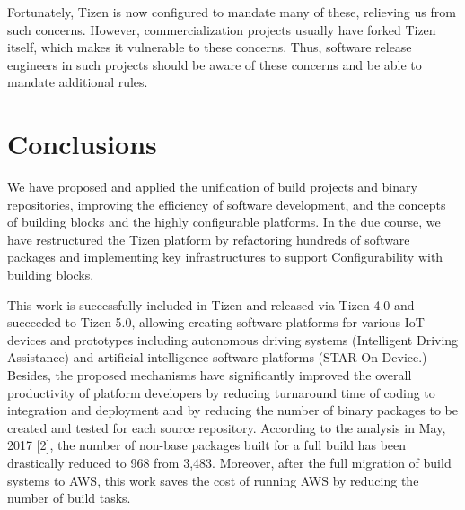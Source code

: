 Fortunately, Tizen is now configured to mandate many of these, relieving us from such concerns. However, commercialization projects usually have forked Tizen itself, which makes it vulnerable to these concerns. Thus, software release engineers in such projects should be aware of these concerns and be able to mandate additional rules.


\section{Conclusions}

We have proposed and applied the unification of build projects and binary repositories, improving the efficiency of software development, and the concepts of building blocks and the highly configurable platforms. In the due course, we have restructured the Tizen platform by refactoring hundreds of software packages and implementing key infrastructures to support Configurability with building blocks.


This work is successfully included in Tizen and released via Tizen 4.0 and succeeded to Tizen 5.0, allowing creating software platforms for various IoT devices and prototypes including autonomous driving systems (Intelligent Driving Assistance) and artificial intelligence software platforms (STAR On Device.) Besides, the proposed mechanisms have significantly improved the overall productivity of platform developers by reducing turnaround time of coding to integration and deployment and by reducing the number of binary packages to be created and tested for each source repository. According to the analysis in May, 2017 [2], the number of non-base packages built for a full build has been drastically reduced to 968 from 3,483. Moreover, after the full migration of build systems to AWS, this work saves the cost of running AWS by reducing the number of build tasks.




